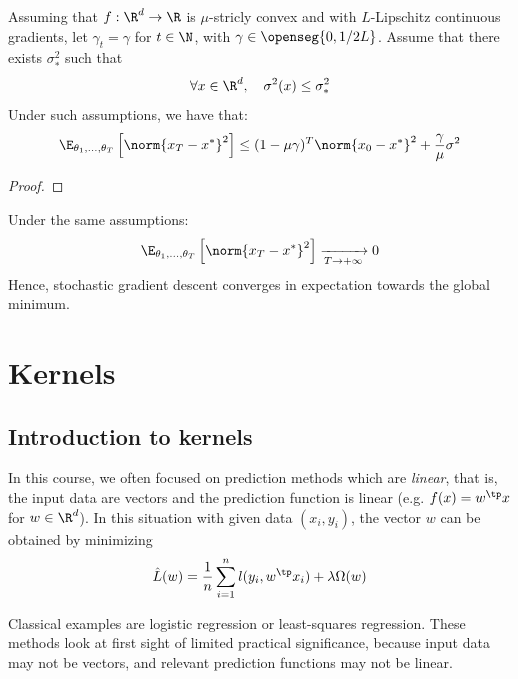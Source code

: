 \documentclass[toc, titlepaged]{../cs-classes/cs-classes}
\begin{document}
\begin{theorem}
    Assuming that $f:\R^d\to\R$ is $\mu$-stricly convex and with $L$-Lipschitz continuous gradients, let $\gamma_t=\gamma$ for $t\in\N$, with $\gamma\in\openseg{0, 1/2L}$. Assume that there exists $\sigma^2_*$ such that
    \begin{equation*}
        \forall x\in\R^d, \quad \sigma^2(x)\leq\sigma^2_*
    \end{equation*}
    Under such assumptions, we have that:
    \begin{equation*}
        \E_{\theta_1,\dots,\theta_T}\left[\norm{x_T-x^*}^2\right] \leq (1-\mu\gamma)^T\norm{x_0-x^*}^2+\frac{\gamma}{\mu}\sigma^2
    \end{equation*}
\end{theorem}
\begin{proof}
\end{proof}

\begin{corollary}
    Under the same assumptions:
    \begin{equation*}
        \E_{\theta_1,\dots,\theta_T}\left[\norm{x_T-x^*}^2\right] \xrightarrow[T\to+\infty]{} 0
    \end{equation*}
    Hence, stochastic gradient descent converges in expectation towards the global minimum.
\end{corollary}

\section{Kernels}
\subsection{Introduction to kernels}
In this course, we often focused on prediction methods which are \emph{linear}, that is, the input data are vectors and the prediction function is linear (e.g. $f(x)=w^\tp x$ for $w\in\R^d$). In this situation with given data $(x_i, y_i)$, the vector $w$ can be obtained by minimizing
\begin{equation*}
    \hat{L}(w)=\frac{1}{n}\sum_{i=1}^n l(y_i, w^\tp x_i) + \lambda \Omega(w)
\end{equation*}

Classical examples are logistic regression or least-squares regression. These methods look at first sight of limited practical significance, because input data may not be vectors, and relevant prediction functions may not be linear.
\end{document}
